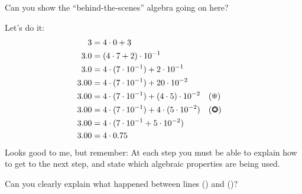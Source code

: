 \begin{question}
Can you show the ``behind-the-scenes'' algebra going on here?
\end{question}

Let's do it:
\begin{align*}
3 &= 4\cdot 0 + 3 \\
3.0 &= (4 \cdot 7  + 2 )\cdot 10^{-1} \\
3.0 &= 4 \cdot (7\cdot 10^{-1})  + 2 \cdot 10^{-1} \\
3.00 &= 4 \cdot (7\cdot 10^{-1})  + 20 \cdot 10^{-2} \\
3.00 &= 4 \cdot (7\cdot 10^{-1})  + (4\cdot 5) \cdot 10^{-2} & &\text{(\ding{100})}\\
3.00 &= 4 \cdot (7\cdot 10^{-1})  + 4\cdot (5 \cdot 10^{-2}) & &\text{(\ding{98})}\\
3.00 &= 4 \cdot (7\cdot 10^{-1}  + 5 \cdot 10^{-2}) \\
3.00 &= 4 \cdot 0.75 
\end{align*}
Looks good to me, but remember: At each step you must be able to
explain how to get to the next step, and state which algebraic
properties are being used.


\begin{question} 
Can you clearly explain what happened between lines () and
()?
\end{question}
\QM








